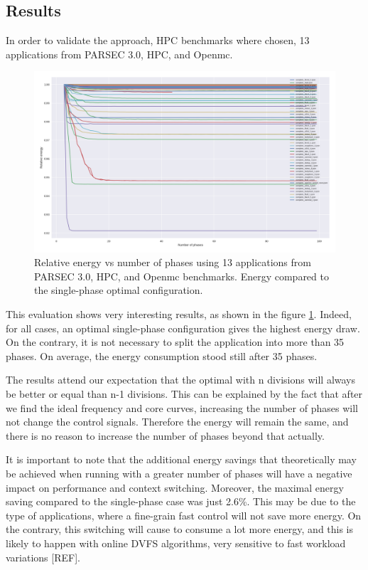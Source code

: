 \subsection{Results}


In order to validate the approach, HPC benchmarks where chosen, 13 applications from PARSEC 3.0, HPC, and Openmc.

\begin{figure}[H]
\includegraphics[width=\columnwidth]{fingerprint/figures/energy_per_phase.png}
    \caption{Relative energy vs number of phases using 13 applications from PARSEC 3.0, HPC, and Openmc benchmarks. Energy compared to the single-phase optimal configuration.}
    \label{fig:relative_energy}
\end{figure}

This evaluation shows very interesting results, as shown in the figure \ref{fig:relative_energy}. Indeed, for all cases, an optimal single-phase configuration gives the highest energy draw. On the contrary, it is not necessary to split the application into more than 35 phases. On average, the energy consumption stood still after 35 phases. 

The results attend our expectation that the optimal with n divisions will always be better or equal than n-1 divisions. This can be explained by the fact that after we find the ideal frequency and core curves, increasing the number of phases will not change the control signals. Therefore the energy will remain the same, and there is no reason to increase the number of phases beyond that actually. 

It is important to note that the additional energy savings that theoretically may be achieved when running with a greater number of phases will have a negative impact on performance and context switching. Moreover, the maximal energy saving compared to the single-phase case was just 2.6\%. This may be due to the type of applications, where a fine-grain fast control will not save more energy. On the contrary, this switching will cause to consume a lot more energy, and this is likely to happen with online DVFS algorithms, very sensitive to fast workload variations [REF].

